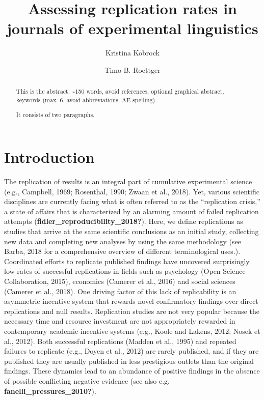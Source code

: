 \documentclass[]{elsarticle} %
\begin{document}
\begin{frontmatter}

  \title{Assessing replication rates in journals of experimental
linguistics}
    \author[University of Osnabrück]{Kristina Kobrock}
    \author[Universitetet i Oslo]{Timo B. Roettger}
  
      \address[University of Osnabrück]{Department}
    \address[Universitetet i Oslo]{Department of Linguistics and
Scandinavian Studies}
  
  \begin{abstract}
  This is the abstract. \textasciitilde150 words, avoid references,
  optional graphical abstract, keywords (max. 6, avoid abbreviations, AE
  spelling)

  It consists of two paragraphs.
  \end{abstract}
  
 \end{frontmatter}

\hypertarget{introduction}{%
\section{Introduction}\label{introduction}}

The replication of results is an integral part of cumulative
experimental science (e.g., Campbell, 1969; Rosenthal, 1990; Zwaan et
al., 2018). Yet, various scientific disciplines are currently facing
what is often referred to as the ``replication crisis,'' a state of
affairs that is characterized by an alarming amount of failed
replication attempts (\textbf{fidler\_reproducibility\_2018?}). Here, we
define replications as studies that arrive at the same scientific
conclusions as an initial study, collecting new data and completing new
analyses by using the same methodology (see Barba, 2018 for a
comprehensive overview of different terminological uses.). Coordinated
efforts to replicate published findings have uncovered surprisingly low
rates of successful replications in fields such as psychology (Open
Science Collaboration, 2015), economics (Camerer et al., 2016) and
social sciences (Camerer et al., 2018). One driving factor of this lack
of replicability is an asymmetric incentive system that rewards novel
confirmatory findings over direct replications and null results.
Replication studies are not very popular because the necessary time and
resource investment are not appropriately rewarded in contemporary
academic incentive systems (e.g., Koole and Lakens, 2012; Nosek et al.,
2012). Both successful replications (Madden et al., 1995) and repeated
failures to replicate (e.g., Doyen et al., 2012) are rarely published,
and if they are published they are usually published in less prestigious
outlets than the original findings. These dynamics lead to an abundance
of positive findings in the absence of possible conflicting negative
evidence (see also e.g. \textbf{fanelli\_pressures\_2010?}).
\end{document}

